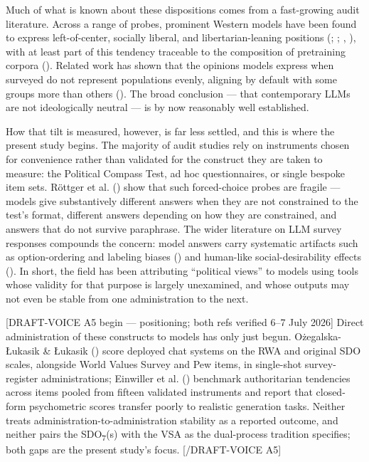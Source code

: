 \documentclass[
]{article}
\begin{document}
Much of what is known about these dispositions comes from a fast-growing
audit literature. Across a range of probes, prominent Western models
have been found to express left-of-center, socially liberal, and
libertarian-leaning positions (; ;
,
), with at least part of this tendency
traceable to the composition of pretraining corpora
(). Related work has shown
that the opinions models express when surveyed do not represent
populations evenly, aligning by default with some groups more than
others (). The broad
conclusion --- that contemporary LLMs are not ideologically neutral ---
is by now reasonably well established.

How that tilt is measured, however, is far less settled, and this is
where the present study begins. The majority of audit studies rely on
instruments chosen for convenience rather than validated for the
construct they are taken to measure: the Political Compass Test, ad hoc
questionnaires, or single bespoke item sets. Röttger et al.
() show that such forced-choice probes
are fragile --- models give substantively different answers when they
are not constrained to the test's format, different answers depending on
how they are constrained, and answers that do not survive paraphrase.
The wider literature on LLM survey responses compounds the concern:
model answers carry systematic artifacts such as option-ordering and
labeling biases () and human-like social-desirability effects
(). In short, the field
has been attributing ``political views'' to models using tools whose
validity for that purpose is largely unexamined, and whose outputs may
not even be stable from one administration to the next.

{[}DRAFT-VOICE A5 begin --- positioning; both refs verified 6--7 July
2026{]} Direct administration of these constructs to models has only
just begun. Ożegalska-Łukasik \& Łukasik
() score deployed chat systems on the
RWA and original SDO scales, alongside World Values Survey and Pew
items, in single-shot survey-register administrations; Einwiller et al.
() benchmark authoritarian tendencies
across items pooled from fifteen validated instruments and report that
closed-form psychometric scores transfer poorly to realistic generation
tasks. Neither treats administration-to-administration stability as a
reported outcome, and neither pairs the SDO\textsubscript{7}(s) with the
VSA as the dual-process tradition specifies; both gaps are the present
study's focus. {[}/DRAFT-VOICE A5{]}
\end{document}
